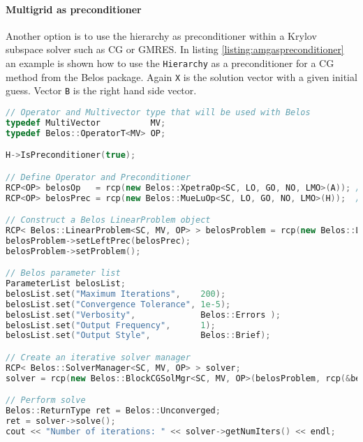 \paragraph{Multigrid as preconditioner}
Another option is to use the \MueLu hierarchy as preconditioner within a Krylov subspace solver such as CG or GMRES. In listing \ref{listing:amgaspreconditioner} an example is shown how to use the \verb|Hierarchy| as a preconditioner for a CG method from the Belos package.
Again \verb|X| is the solution vector with a given initial guess. Vector \verb|B| is the right hand side vector.
\begin{Listing}
\begin{center}
\begin{lstlisting}[language=C++,label=listing:AmgAsPreconditioner]
// Operator and Multivector type that will be used with Belos
typedef MultiVector          MV;
typedef Belos::OperatorT<MV> OP;

H->IsPreconditioner(true);

// Define Operator and Preconditioner
RCP<OP> belosOp   = rcp(new Belos::XpetraOp<SC, LO, GO, NO, LMO>(A)); // Turns a Xpetra::Matrix object into a Belos operator
RCP<OP> belosPrec = rcp(new Belos::MueLuOp<SC, LO, GO, NO, LMO>(H));  // Turns a MueLu::Hierarchy object into a Belos operator

// Construct a Belos LinearProblem object
RCP< Belos::LinearProblem<SC, MV, OP> > belosProblem = rcp(new Belos::LinearProblem<SC, MV, OP>(belosOp, X, B));
belosProblem->setLeftPrec(belosPrec);
belosProblem->setProblem();

// Belos parameter list
ParameterList belosList;
belosList.set("Maximum Iterations",    200);
belosList.set("Convergence Tolerance", 1e-5);
belosList.set("Verbosity",             Belos::Errors );
belosList.set("Output Frequency",      1);
belosList.set("Output Style",          Belos::Brief);

// Create an iterative solver manager
RCP< Belos::SolverManager<SC, MV, OP> > solver;
solver = rcp(new Belos::BlockCGSolMgr<SC, MV, OP>(belosProblem, rcp(&belosList, false)));

// Perform solve
Belos::ReturnType ret = Belos::Unconverged;
ret = solver->solve();
cout << "Number of iterations: " << solver->getNumIters() << endl;
\end{lstlisting}
\caption{Use AMG as preconditioner within Belos.}
\label{listing:amgaspreconditioner}
\end{center}
\end{Listing}

